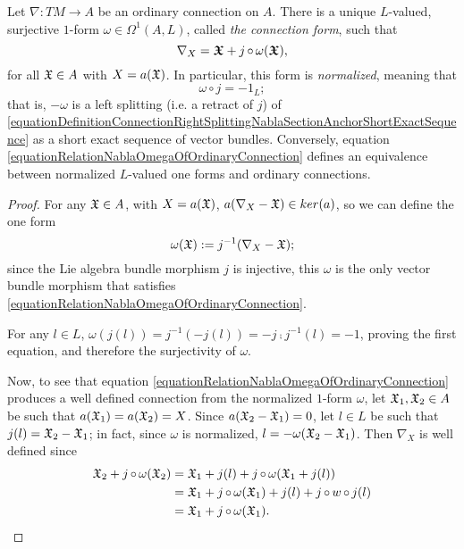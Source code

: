\begin{theorem}\label{theoremOrdinaryConnectionEquialenceRelatoinNablasandNormalizedForms}
Let $\nabla:TM \to A$ be an ordinary connection on $A$. There is a unique $L$-valued, surjective $1$-form $\omega \in \Omega^1(A, L)$, called \textit{the connection form}, such that
\begin{equation} \label{equationRelationNablaOmegaOfOrdinaryConnection}
    \nabla_X = \bm{\mathfrak{X}} + j \operatorname{\circ} \omega(\bm{\mathfrak{X}}),
\end{equation}
for all $\mathfrak{X} \in A$ with $X = a(\mathfrak{X})$. In particular, this form is \textit{normalized}, meaning that
\begin{equation}\label{equationNormalizedOneFormOrdinaryConnectionOnTransitiveAlgebroid}
    \omega \circ j = - 1_{L};
\end{equation}
that is, $-\omega$ is a left splitting (i.e. a retract of $j$) of \eqref{equationDefinitionConnectionRightSplittingNablaSectionAnchorShortExactSequence} as a short exact sequence of vector bundles. Conversely, equation \eqref{equationRelationNablaOmegaOfOrdinaryConnection} defines an equivalence between normalized $L$-valued one forms and ordinary connections.
\end{theorem}

\begin{proof}
For any $\mathfrak{X} \in A$, with $X = a(\mathfrak{X})$, $a(\nabla_X - \mathfrak{X}) \in ker(a)$, so we can define the one form 
\begin{equation}\label{equationPreciseDefinitionOrdinaryConnectionFormUnique}
    \omega(\mathfrak{X}) := j^{-1}(\nabla_X - \mathfrak{X});
\end{equation}
since the Lie algebra bundle morphism $j$ is injective, this $\omega$ is the only vector bundle morphism that satisfies \eqref{equationRelationNablaOmegaOfOrdinaryConnection}.

For any $l \in L$, $\omega(j(l)) = j^{-1}(- j(l)) = - j \comp j^{-1}(l) = -1$, proving the first equation, and therefore the surjectivity of $\omega$.

Now, to see that equation \eqref{equationRelationNablaOmegaOfOrdinaryConnection} produces a well defined connection from the normalized $1$-form $\omega$, let $\mathfrak{X}_1, \mathfrak{X}_2 \in A$ be such that $a(\mathfrak{X}_1) = a(\mathfrak{X}_2) = X$. Since $a(\mathfrak{X}_2 - \mathfrak{X}_1) = 0$, let $l \in L$ be such that $j(l) = \mathfrak{X}_2 - \mathfrak{X}_1$; in fact, since $\omega$ is normalized, $l = -\omega(\mathfrak{X}_2 - \mathfrak{X}_1)$. Then $\nabla_X$ is well defined since
\begin{align*}
    \mathfrak{X}_2 + j \operatorname{\circ} \omega(\mathfrak{X}_2) 
        &= \mathfrak{X}_1 + j(l) + j \operatorname{\circ} \omega(\mathfrak{X}_1 + j(l))\\
        &= \mathfrak{X}_1 + j \operatorname{\circ} \omega(\mathfrak{X}_1) + j(l) + j \operatorname{\circ} w \operatorname{\circ} j(l)\\
        &= \mathfrak{X}_1 + j \operatorname{\circ} \omega(\mathfrak{X}_1).
\end{align*}
\end{proof}


